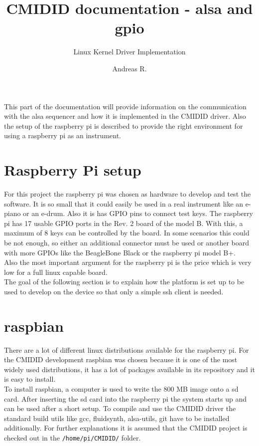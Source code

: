 \documentclass[paper=a4,fontsize=11pt,twocolumn,pagesize,bibtotoc]{scrartcl}
\title{CMIDID documentation - alsa and gpio }
\subtitle{Linux Kernel Driver Implementation}
\author{Andreas R.}
\begin{document}
	\maketitle
	
This part of the documentation will provide information on the communication with the alsa sequencer and how it is implemented in the CMIDID driver. Also the setup of the raspberry pi is described to provide the right environment for using a  raspberry pi as an instrument.
\section{Raspberry Pi setup}
For this project the raspberry pi was chosen as hardware to develop and test the software. It is so small  that it could easily be used in a real instrument like an e-piano or an e-drum. Also it is has GPIO pins to connect test keys. The raspberry pi has 17 usable GPIO ports in the Rev. 2 board of the model B. With this, a maximum of 8 keys can be controlled by the board. In some scenarios this could be not enough, so either an additional connector must be used or another board with more GPIOs like the BeagleBone Black or the raspberry pi model B+.\\
Also the most important argument for the raspberry pi is the price which is very low for a full linux capable board. 
\\
The goal of the following section is to explain how the platform is set up to be used to develop on the device so that only a simple ssh client is needed.
\cite{gpiopins}
\section{raspbian}
There are a lot of different linux distributions available for the raspberry pi. For the CMIDID development raspbian was chosen because it is one of the most widely used distributions, it has a lot of packages available in its repository and it is easy to install. \\
To install raspbian, a computer is used to write the 800 MB image onto a sd card. After inserting the sd card into the raspberry pi the system starts up and can be used after a short setup. To compile and use the CMIDID driver the standard build utils like gcc, fluidsynth, alsa-utils, git have to be installed additionally. For further explanations it is assumed that the CMIDID project is checked out in the \texttt{/home/pi/CMIDID/} folder.
\end{document}
